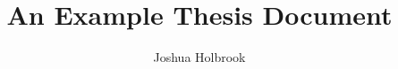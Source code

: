 \documentclass{uafthesis}
\begin{document}
\title{An Example Thesis Document}
\author{Joshua Holbrook}


\makesig
\maketitle

\begin{abstract}
  
\end{abstract}


\tableofcontents
\listoffigures
\listoftables
\listofappendices

\begin{acknowledgements}
  
\end{acknowledgements}

\begin{quotepage}
  
\end{quotepage}




\nocite{wikibook}



\appendix

\end{document}
